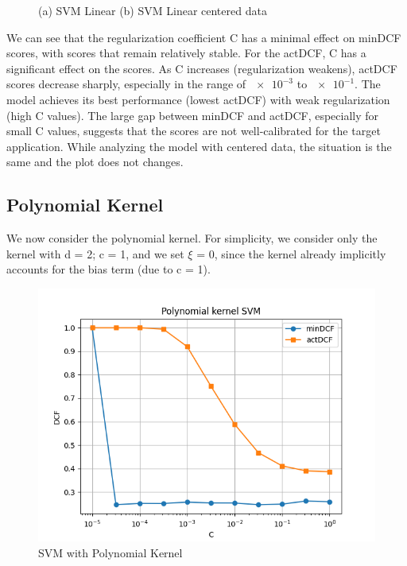 \documentclass[12pt, a4paper]{article}
\begin{document}
\begin{figure}[ht]
    \centering
    \caption{(a) SVM Linear (b) SVM Linear centered data}
    \label{fig:SVM_Linear}
\end{figure}

We can see that the regularization coefficient C has a minimal effect on minDCF scores, with scores that remain relatively stable. For the actDCF, C has a significant effect on the scores. As C increases (regularization weakens), actDCF scores decrease sharply, especially in the range of $\num{e-3}$ to $\num{e-1}$. The model achieves its best performance (lowest actDCF) with weak regularization (high C values).
The large gap between minDCF and actDCF, especially for small C values, suggests that the scores are not well-calibrated for the target application.
While analyzing the model with centered data, the situation is the same and the plot does not changes.

\subsection{Polynomial Kernel}
We now consider the polynomial kernel. For simplicity, we consider only the kernel with d = 2; c = 1, and we set $\xi$ = 0, since the kernel already implicitly accounts for the bias term (due to c = 1).

\begin{figure}[ht]
	\centering
	\includegraphics[width=.4\textwidth]{project09/svm_poly_kernel}
	\caption{SVM with Polynomial Kernel}
	\label{fig:SVM_Poly}
\end{figure}
\end{document}
